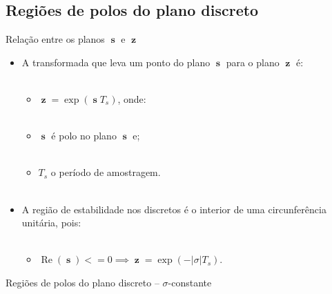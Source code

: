 \documentclass[aspectratio=169,11pt,t,xcolor={usenames,dvipsnames,x11names}]{beamer}
\DeclareMathOperator{\real}{Re}
\DeclareMathOperator{\s}{\textbf{s}}
\DeclareMathOperator{\z}{\textbf{z}}
\begin{document}
\subsection{Regiões de polos do plano discreto}
\begin{frame}{Relação entre os planos $\s$ e $\z$}
	\begin{itemize}
		\item A transformada que leva um ponto do plano $\s$ para o plano $\z$ é:\\~\\
		\begin{itemize}
			\item $\z = \exp{\left(\s{}T_s\right)}$, onde:\\~\\
			\item $\s$ é polo no plano $\s$ e;\\~\\
			\item $T_s$ o período de amostragem.\\~\\
		\end{itemize}\pause
		\item A região de estabilidade nos discretos é o interior de uma circunferência unitária, pois:\\~\\
		\begin{itemize}
			\item $\real{\left(\s\right)} <= 0 \implies \z = \exp{\left(-|\sigma|T_s\right)}$.
		\end{itemize}
	\end{itemize}
\end{frame}

\begin{frame}[c]{Regiões de polos do plano discreto -- $\sigma$-constante}
	\begin{figure}[!ht]
		\centering
		\begin{subfigure}[t]{0.4\columnwidth}
				
		\end{subfigure}
		\begin{subfigure}[t]{0.4\columnwidth}
				
		\end{subfigure}
	\end{figure}
\end{frame}
\end{document}
